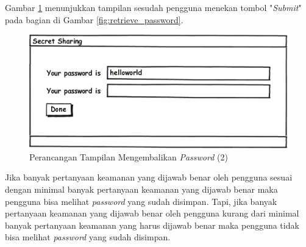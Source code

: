 Gambar \ref{fig:password} menunjukkan tampilan sesudah pengguna menekan tombol "\textit{Submit}" pada bagian di Gambar \ref{fig:retrieve_password}.

\begin{figure}[H]
	\centerline{\includegraphics[scale=0.5]{Gambar/password}}
	\caption{Perancangan Tampilan Mengembalikan \textit{Password} (2)}\label{fig:password}
\end{figure}

Jika banyak pertanyaan keamanan yang dijawab benar oleh pengguna sesuai dengan minimal banyak pertanyaan keamanan yang dijawab benar maka pengguna bisa melihat \textit{password} yang sudah disimpan. Tapi, jika banyak pertanyaan keamanan yang dijawab benar oleh pengguna kurang dari minimal banyak pertanyaan keamanan yang harus dijawab benar maka pengguna tidak bisa melihat \textit{password} yang sudah disimpan.